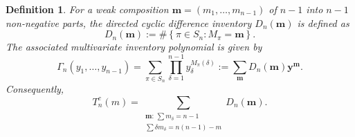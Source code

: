 \documentclass[11pt,a4paper]{amsart}
\newtheorem{definition}[theorem]{Definition}
\newcommand{\1}{\mathbf{1}}
\begin{document}
\begin{definition}
For a weak composition $\mathbf{m} = (m_1, \dots, m_{n-1})$ of $n-1$ into $n-1$ non-negative parts, the \emph{directed cyclic difference inventory} $D_n(\mathbf{m})$ is defined as
\[
D_n(\mathbf{m}) := \#\left\{ \pi \in S_n : M_\pi = \mathbf{m} \right\}.
\]
The associated multivariate inventory polynomial is given by
\[
\Gamma_n(y_1, \dots, y_{n-1})=\sum_{\pi \in S_n} \prod_{\delta=1}^{n-1} y_\delta^{M_\pi(\delta)} := \sum_{\mathbf{m}} D_n(\mathbf{m})  \bm y^{\bm m}.
\]
Consequently,
\begin{equation}
T_n^c(m)
=\sum_{\substack{\bm m:\,\sum m_\delta=n-1\\
\sum\delta m_\delta=n(n-1)-m}}
D_n(\bm m).
\end{equation}
\end{definition}
\end{document}
